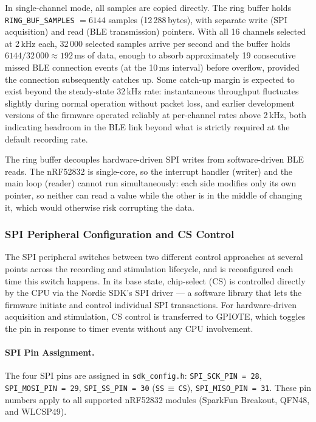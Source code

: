 In single-channel mode, all samples are copied directly. The ring buffer holds
\texttt{RING\_BUF\_SAMPLES} $= 6144$ samples (12\,288\,bytes), with separate
write (SPI acquisition) and read (BLE transmission) pointers. With all 16 channels
selected at 2\,kHz each, 32\,000 selected samples arrive per second and the buffer
holds $6144/32\,000 \approx 192$\,ms of data, enough to absorb approximately 19
consecutive missed BLE connection events (at the 10\,ms interval) before overflow,
provided the connection subsequently catches up. Some catch-up margin is expected
to exist beyond the steady-state 32\,kHz rate: instantaneous throughput fluctuates
slightly during normal operation without packet loss, and earlier development
versions of the firmware operated reliably at per-channel rates above 2\,kHz, both
indicating headroom in the BLE link beyond what is strictly required at the default
recording rate.

The ring buffer decouples hardware-driven SPI writes from software-driven BLE reads.
The nRF52832 is single-core, so the interrupt handler (writer) and the main loop
(reader) cannot run simultaneously: each side modifies only its own pointer, so
neither can read a value while the other is in the middle of changing it, which
would otherwise risk corrupting the data.

\subsubsection{SPI Peripheral Configuration and CS Control}
\label{sec:spi_timing}

The SPI peripheral switches between two different control approaches at several
points across the recording and stimulation lifecycle, and is reconfigured each
time this switch happens. In its base state, chip-select (CS) is controlled directly
by the CPU via the Nordic SDK's SPI driver --- a software library that lets the
firmware initiate and control individual SPI transactions. For hardware-driven
acquisition and stimulation, CS control is transferred to GPIOTE, which toggles
the pin in response to timer events without any CPU involvement.

\paragraph{SPI Pin Assignment.}
The four SPI pins are assigned in \texttt{sdk\_config.h}:
\texttt{SPI\_SCK\_PIN\,=\,28}, \texttt{SPI\_MOSI\_PIN\,=\,29},
\texttt{SPI\_SS\_PIN\,=\,30} (\texttt{SS}\,$\equiv$\,\texttt{CS}),
\texttt{SPI\_MISO\_PIN\,=\,31}. These pin numbers apply to all supported
nRF52832 modules (SparkFun Breakout, QFN48, and WLCSP49).


